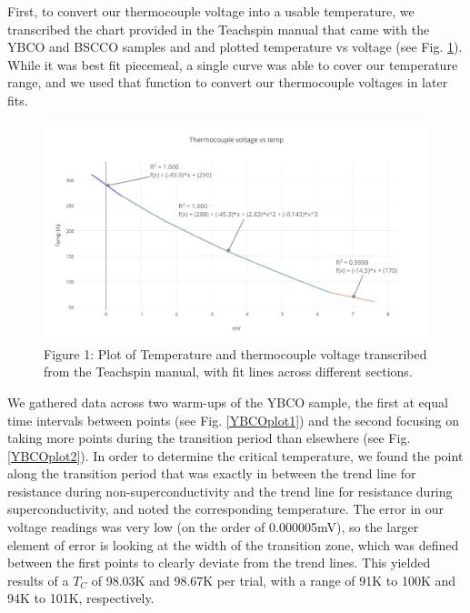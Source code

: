 \documentclass[prb,preprint]{revtex4-1}
\begin{document}
First, to convert our thermocouple voltage into a usable temperature, we transcribed the chart provided in the Teachspin manual that came with the YBCO and BSCCO samples and and plotted temperature vs voltage (see Fig. \ref{TCplot}). While it was best fit piecemeal, a single curve was able to cover our temperature range, and we used that function to convert our thermocouple voltages in later fits.

\begin{figure}[width=5in][h!]
\centering
\includegraphics{thermocouple_voltage_vs_temp.png}
\caption{Figure 1: Plot of Temperature and thermocouple voltage transcribed from the Teachspin manual, with fit lines across different sections.}
\label{TCplot}
\end{figure}

We gathered data across two warm-ups of the YBCO sample, the first at equal time intervals between points (see Fig. \ref{YBCOplot1}) and the second focusing on taking more points during the transition period than elsewhere (see Fig. \ref{YBCOplot2}). In order to determine the critical temperature, we found the point along the transition period that was exactly in between the trend line for resistance during non-superconductivity and the trend line for resistance during superconductivity, and noted the corresponding temperature. The error in our voltage readings was very low (on the order of 0.000005mV), so the larger element of error is looking at the width of the transition zone, which was defined between the first points to clearly deviate from the trend lines. This yielded results of a $T_C$ of 98.03K and 98.67K per trial, with a range of 91K to 100K and 94K to 101K, respectively.
\end{document}
